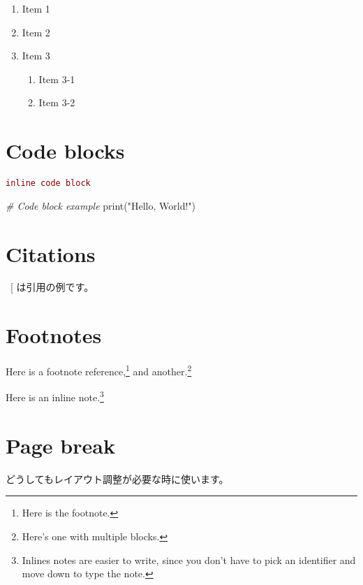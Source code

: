 \documentclass[
  japanese,
  letterpaper,
  lualatex,
  ja=standard,
  10pt,
  a4paper,
  textwidth-limit=50,
  openany]{bxjsbook}
\newenvironment{Shaded}{\begin{snugshade}}{\end{snugshade}}
\newcommand{\BuiltInTok}[1]{#1}
\newcommand{\CommentTok}[1]{\textcolor[rgb]{0.56,0.35,0.01}{\textit{#1}}}
\newcommand{\NormalTok}[1]{#1}
\newcommand{\StringTok}[1]{\textcolor[rgb]{0.31,0.60,0.02}{#1}}
\providecommand{\tightlist}{%
  \setlength{\itemsep}{0pt}\setlength{\parskip}{0pt}}
\let\oldtexttt\texttt
\renewcommand{\texttt}[1]{  %
  \colorbox{codebg}{  %
    \textcolor{Maroon}{  %
      \small  %
      \oldtexttt{#1}
    }
  }
}
\begin{document}
\begin{enumerate}
\def\labelenumi{\arabic{enumi}.}
\tightlist
\item
  Item 1
\item
  Item 2
\item
  Item 3

  \begin{enumerate}
  \def\labelenumii{\arabic{enumii}.}
  \tightlist
  \item
    Item 3-1
  \item
    Item 3-2
  \end{enumerate}
\end{enumerate}

\section{Code blocks}\label{code-blocks}

\texttt{inline\ code\ block}

\begin{Shaded}
\begin{Highlighting}[]
\CommentTok{\# Code block example}
\BuiltInTok{print}\NormalTok{(}\StringTok{"Hello, World!"}\NormalTok{)}
\end{Highlighting}
\end{Shaded}

\section{Citations}\label{citations}

~{[}\citeproc{ref-Hall2006}{1}{]} は引用の例です。

\section{Footnotes}\label{footnotes}

Here is a footnote reference,\footnote{Here is the footnote.} and
another.\footnote{Here's one with multiple blocks.}

Here is an inline note.\footnote{Inlines notes are easier to write,
  since you don't have to pick an identifier and move down to type the
  note.}

\section{Page break}\label{page-break}

どうしてもレイアウト調整が必要な時に使います。
\end{document}
